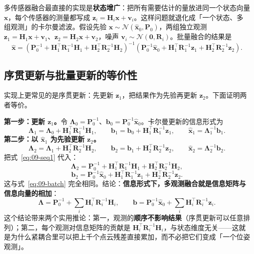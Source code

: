 多传感器融合最直接的实现是\textbf{状态增广}：把所有需要估计的量放进同一个状态向量 $\bm{x}$，每个传感器的测量都写成 $\bm{z}_i=\bm{H}_i\bm{x}+\bm{v}_i$。这样问题就退化成「一个状态、多组观测」的卡尔曼滤波。假设先验 $\bm{x}\sim\mathcal{N}(\hat{\bm{x}}_0,\bm{P}_0)$，两组独立观测 $\bm{z}_1=\bm{H}_1\bm{x}+\bm{v}_1$、$\bm{z}_2=\bm{H}_2\bm{x}+\bm{v}_2$，噪声 $\bm{v}_i\sim\mathcal{N}(\bm{0},\bm{R}_i)$。批量融合的结果是
\begin{equation}
  \hat{\bm{x}} = \left(\bm{P}_0^{-1}+\bm{H}_1^{\top}\bm{R}_1^{-1}\bm{H}_1+\bm{H}_2^{\top}\bm{R}_2^{-1}\bm{H}_2\right)^{-1}
  \left(\bm{P}_0^{-1}\hat{\bm{x}}_0+\bm{H}_1^{\top}\bm{R}_1^{-1}\bm{z}_1+\bm{H}_2^{\top}\bm{R}_2^{-1}\bm{z}_2\right).
  \label{eq:09-batch}
\end{equation}

\subsection{序贯更新与批量更新的等价性}

实现上更常见的是序贯更新：先更新 $\bm{z}_1$，把结果作为先验再更新 $\bm{z}_2$。下面证明两者等价。

\textbf{第一步：更新 $\bm{z}_1$。}令 $\bm{\Lambda}_0=\bm{P}_0^{-1}$、$\bm{b}_0=\bm{P}_0^{-1}\hat{\bm{x}}_0$。卡尔曼更新的信息形式为
\begin{equation}
  \bm{\Lambda}_1 = \bm{\Lambda}_0+\bm{H}_1^{\top}\bm{R}_1^{-1}\bm{H}_1,
  \qquad
  \bm{b}_1 = \bm{b}_0+\bm{H}_1^{\top}\bm{R}_1^{-1}\bm{z}_1,
  \qquad
  \hat{\bm{x}}_1=\bm{\Lambda}_1^{-1}\bm{b}_1.
  \label{eq:09-seq1}
\end{equation}
\textbf{第二步：以 $\hat{\bm{x}}_1$ 为先验更新 $\bm{z}_2$。}
\begin{equation}
  \bm{\Lambda}_2 = \bm{\Lambda}_1+\bm{H}_2^{\top}\bm{R}_2^{-1}\bm{H}_2,
  \qquad
  \bm{b}_2 = \bm{b}_1+\bm{H}_2^{\top}\bm{R}_2^{-1}\bm{z}_2,
  \qquad
  \hat{\bm{x}}_2=\bm{\Lambda}_2^{-1}\bm{b}_2.
\end{equation}
把式~\eqref{eq:09-seq1} 代入：
\begin{equation}
  \bm{\Lambda}_2 = \bm{P}_0^{-1}+\bm{H}_1^{\top}\bm{R}_1^{-1}\bm{H}_1+\bm{H}_2^{\top}\bm{R}_2^{-1}\bm{H}_2,
\end{equation}
\begin{equation}
  \bm{b}_2 = \bm{P}_0^{-1}\hat{\bm{x}}_0+\bm{H}_1^{\top}\bm{R}_1^{-1}\bm{z}_1+\bm{H}_2^{\top}\bm{R}_2^{-1}\bm{z}_2.
\end{equation}
这与式~\eqref{eq:09-batch} 完全相同。结论：\textbf{信息形式下，多观测融合就是信息矩阵与信息向量的相加}：
\begin{equation}
  \bm{\Lambda} = \bm{P}_0^{-1}+\sum_i\bm{H}_i^{\top}\bm{R}_i^{-1}\bm{H}_i,
  \qquad
  \bm{b} = \bm{P}_0^{-1}\hat{\bm{x}}_0+\sum_i\bm{H}_i^{\top}\bm{R}_i^{-1}\bm{z}_i.
  \label{eq:09-information-sum}
\end{equation}
这个结论带来两个实用推论：第一，观测的\textbf{顺序不影响结果}（序贯更新可以任意排列）；第二，每个观测对信息矩阵的贡献是 $\bm{H}_i^{\top}\bm{R}_i^{-1}\bm{H}_i$，与状态维度无关——这就是为什么紧耦合里可以把上千个点云残差直接累加，而不必把它们变成「一个位姿观测」。

